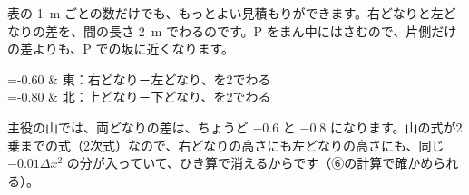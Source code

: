 表の \qty{1}{m} ごとの数だけでも、もっとよい見積もりができます。右どなりと左どなりの差を、間の長さ \qty{2}{m} でわるのです。P をまん中にはさむので、片側だけの差よりも、P での坂に近くなります。
\begin{bkhenkei}[0.46]
=-0.60 & 東：右どなり－左どなり、を2でわる \\
=-0.80 & 北：上どなり－下どなり、を2でわる \\
\end{bkhenkei}
主役の山では、両どなりの差は、ちょうど $-0.6$ と $-0.8$ になります。山の式が2乗までの式（2次式）なので、右どなりの高さにも左どなりの高さにも、同じ $-0.01\Delta x^2$ の分が入っていて、ひき算で消えるからです（⑥の計算で確かめられる）。


